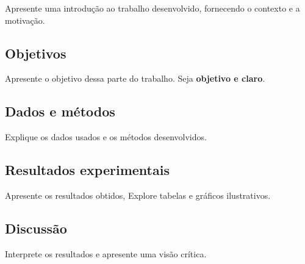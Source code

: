 \documentclass{article}
\begin{document}
Apresente uma introdução ao trabalho desenvolvido, fornecendo o contexto e a motivação.

\subsection{Objetivos}

Apresente o objetivo dessa parte do trabalho. Seja {\bf objetivo e claro}.

\subsection{Dados e métodos}

Explique os dados usados e os métodos desenvolvidos.

\subsection{Resultados experimentais}

Apresente os resultados obtidos, Explore tabelas e gráficos ilustrativos.

\subsection{Discussão}

Interprete os resultados e apresente uma visão crítica.
\end{document}
